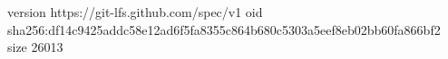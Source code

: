 version https://git-lfs.github.com/spec/v1
oid sha256:df14c9425addc58e12ad6f5fa8355c864b680c5303a5eef8eb02bb60fa866bf2
size 26013
